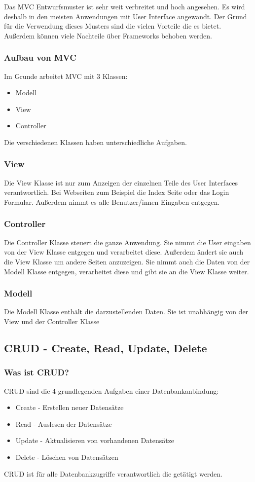 Das MVC Entwurfsmuster ist sehr weit verbreitet und hoch angesehen. Es wird deshalb in den meisten Anwendungen mit User Interface angewandt. Der Grund für die Verwendung dieses Musters sind die vielen Vorteile die es bietet. Außerdem können viele Nachteile über Frameworks behoben werden.

\subsubsection{Aufbau von MVC}
Im Grunde arbeitet MVC mit 3 Klassen:
\begin{itemize}
	\item Modell
	\item View
	\item Controller
\end{itemize}
Die verschiedenen Klassen haben unterschiedliche Aufgaben.

\subsubsection{View}
Die View Klasse ist nur zum Anzeigen der einzelnen Teile des User Interfaces verantwortlich. Bei Webseiten zum Beispiel die Index Seite oder das Login Formular. Außerdem nimmt es alle Benutzer/innen Eingaben entgegen.
\subsubsection{Controller}
Die Controller Klasse steuert die ganze Anwendung. Sie nimmt die User eingaben von der View Klasse entgegen und verarbeitet diese. Außerdem ändert sie auch die View Klasse um andere Seiten anzuzeigen. Sie nimmt auch die Daten von der Modell Klasse entgegen, verarbeitet diese und gibt sie an die View Klasse weiter.
\subsubsection{Modell}
Die Modell Klasse enthält die darzustellenden Daten. Sie ist unabhängig von der View und der Controller Klasse

\subsection{CRUD - Create, Read, Update, Delete} \label{sec:CRUD}

\subsubsection{Was ist CRUD?}
CRUD sind die 4 grundlegenden Aufgaben einer Datenbankanbindung:
\begin{itemize}
	\item Create - Erstellen neuer Datensätze
	\item Read - Auslesen der Datensätze
	\item Update - Aktualisieren von vorhandenen Datensätze
	\item Delete - Löschen von Datensätzen
\end{itemize}
\cite{CRUD}
\newline
CRUD ist für alle Datenbankzugriffe verantwortlich die getätigt werden.


